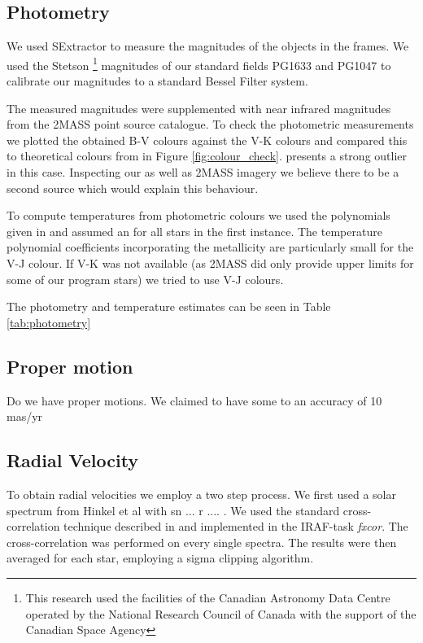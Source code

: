 \subsection{Photometry}
We used SExtractor \citep{1996A&AS..117..393B} to measure the magnitudes of the objects in the frames. We used the Stetson \footnote{This research used the facilities of the Canadian Astronomy Data Centre operated by the National Research Council of Canada with the support of the Canadian Space Agency} magnitudes of our standard fields PG1633 and PG1047 to calibrate our magnitudes to a standard Bessel Filter system. 

The measured  magnitudes were supplemented with near infrared magnitudes from the 2MASS point source catalogue.
To check the photometric measurements we plotted the obtained B-V colours against the V-K colours and compared this to theoretical colours from \citep{2010A&A...512A..54C} in Figure \ref{fig:colour_check}.   presents a strong outlier in this case. Inspecting our as well as 2MASS imagery we believe there to be a second source which would explain this behaviour. 

To compute temperatures from photometric colours we used the polynomials given in  \citep{2010A&A...512A..54C} and assumed an  for all stars in the first instance. The temperature polynomial coefficients incorporating the metallicity are particularly small for the V-J colour. If V-K was not available (as 2MASS did only provide upper limits for some of our program stars) we tried to use V-J colours. 

The photometry and temperature estimates can be seen in Table \ref{tab:photometry}
\subsection{Proper motion}
Do we have proper motions. We claimed to have some to an accuracy of 10 mas/yr

\subsection{Radial Velocity}

To obtain radial velocities we employ a two step process. We first used a solar spectrum from Hinkel et al with sn ... r .... . 
We used the standard cross-correlation technique described in \citep{1979AJ.....84.1511T} and implemented in the IRAF-task \textit{fxcor}. The cross-correlation was performed on every single spectra. The results were then averaged for each star, employing a sigma clipping algorithm. 

